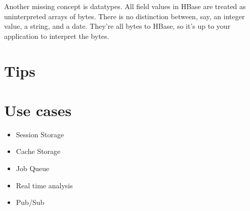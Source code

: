 Another missing concept is datatypes. All field values in HBase are treated as uninterpreted arrays of bytes. There is no distinction between, say, an integer value, a string, and a date. They're all bytes to HBase, so it's up to your application to interpret the bytes.\cite{seven_databases}

\section{Tips}

\section{Use cases}

\begin{itemize}
  \item Session Storage
  \item Cache Storage
  \item Job Queue
  \item Real time analysis
  \item Pub/Sub
\end{itemize}